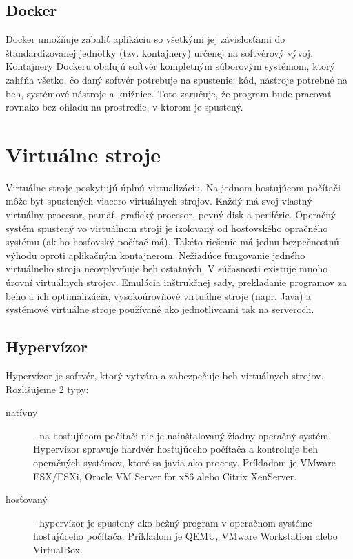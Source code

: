 \documentclass[11pt,final,oneside]{fithesis}
\begin{document}
\subsection{Docker}
Docker umožňuje zabaliť aplikáciu so všetkými jej závislosťami do štandardizovanej jednotky (tzv. kontajnery) určenej na softvérový vývoj. Kontajnery Dockeru obaľujú softvér kompletným súborovým systémom, ktorý
zahŕňa všetko, čo daný softvér potrebuje na spustenie: kód, nástroje potrebné na beh, systémové nástroje a knižnice. Toto zaručuje, že program bude pracovať rovnako bez ohľadu na prostredie, v ktorom
je spustený.\cite{docker}


\section{Virtuálne stroje}
Virtuálne stroje poskytujú úplnú virtualizáciu. Na jednom hosťujúcom počítači môže byť spustených viacero virtuálnych strojov. Každý má svoj vlastný virtuálny procesor, pamäť, grafický procesor, pevný disk 
a periférie. Operačný systém spustený vo virtuálnom stroji je izolovaný od hosťovského opračného systému (ak ho hosťovský počítač má). Takéto riešenie má jednu bezpečnostnú výhodu oproti aplikačným 
kontajnerom. Nežiadúce fungovanie jedného virtuálneho stroja neovplyvňuje beh ostatných.
V súčasnosti existuje mnoho úrovní virtuálnych strojov. Emulácia inštrukčnej sady, prekladanie programov za beho a ich optimalizácia, vysokoúrovňové virtuálne stroje (napr. Java) a systémové virtuálne stroje používané ako
jednotlivcami tak na serveroch.

\subsection{Hypervízor}
Hypervízor je softvér, ktorý vytvára a zabezpečuje beh virtuálnych strojov. Rozlišujeme 2 typy:
\begin{description}
\item[natívny] - na hosťujúcom počítači nie je nainštalovaný žiadny operačný systém. Hypervízor spravuje hardvér hosťujúceho počítača a kontroluje beh operačných systémov, ktoré sa javia ako procesy.
Príkladom je VMware ESX/ESXi, Oracle VM Server for x86 alebo Citrix XenServer.
\item[hosťovaný] - hypervízor je spustený ako bežný program v operačnom systéme hosťujúceho počítača. Príkladom je QEMU, VMware Workstation alebo VirtualBox.
\end{description}
\cite{hypervisorTypes}
\end{document}
